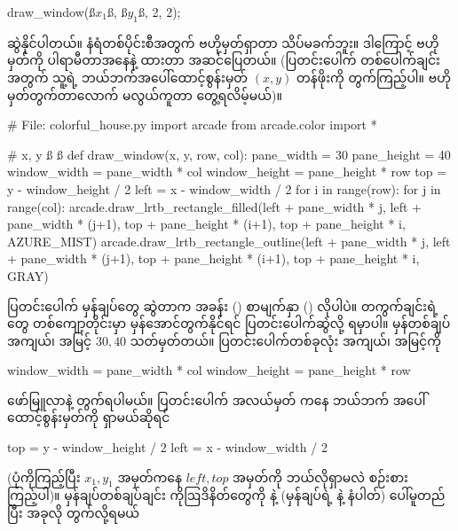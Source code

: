 %
\begin{py}
draw_window(ß$x_1$ß, ß$y_1$ß, 2, 2);
\end{py}
%
ဆွဲနိုင်ပါတယ်။ နံရံတစ်ပိုင်းစီအတွက် ဗဟိုမှတ်ရှာတာ သိပ်မခက်ဘူး။ ဒါကြောင့် ဗဟိုမှတ်ကို ပါရာမီတာအနေနဲ့ ထားတာ အဆင်ပြေတယ်။ (ပြတင်းပေါက် တစ်ပေါက်ချင်းအတွက်  သူ့ရဲ့ ဘယ်ဘက်အပေါ်ထောင့်စွန်းမှတ် $(x,y)$ တန်ဖိုးကို တွက်ကြည့်ပါ။ ဗဟိုမှတ်တွက်တာလောက် မလွယ်ကူတာ တွေ့ရလိမ့်မယ်)။ 

%
\begin{py}
# File: colorful_house.py
import arcade
from arcade.color import *

# x, y ß  ß
def draw_window(x, y, row, col):
    pane_width = 30
    pane_height = 40
    window_width = pane_width * col
    window_height = pane_height * row
    top = y - window_height / 2
    left = x - window_width / 2
    for i in range(row):
        for j in range(col):
            arcade.draw_lrtb_rectangle_filled(left + pane_width * j,
                                              left + pane_width * (j+1),
                                              top + pane_height * (i+1),
                                              top + pane_height * i,
                                              AZURE_MIST)
            arcade.draw_lrtb_rectangle_outline(left + pane_width * j,
                                               left + pane_width * (j+1),
                                               top + pane_height * (i+1),
                                               top + pane_height * i,
                                               GRAY)
\end{py}
%
ပြတင်းပေါက် မှန်ချပ်တွေ ဆွဲတာက အခန်း (\fRefNo{\ref{ch:ch07ctlstmt}}) စာမျက်နှာ (\fRefNo{\pageref{lst:checkerboard}})  လိုပါပဲ။ တကွက်ချင်းရဲ့  တွေ  တစ်ကျော့တိုင်းမှာ မှန်အောင်တွက်နိုင်ရင် ပြတင်းပေါက်ဆွဲလို့ ရမှာပါ။ မှန်တစ်ချပ် အကျယ်၊ အမြင့် $30, 40$ သတ်မှတ်တယ်။ ပြတင်းပေါက်တစ်ခုလုံး အကျယ်၊ အမြင့်ကို
\begin{codetxt}
window_width = pane_width * col
window_height = pane_height * row
\end{codetxt}
ဖော်မြူလာနဲ့ တွက်ရပါမယ်။ ပြတင်းပေါက် အလယ်မှတ်  ကနေ ဘယ်ဘက် အပေါ်ထောင့်စွန်းမှတ်ကို ရှာမယ်ဆိုရင်
\begin{codetxt}
top = y - window_height / 2
left = x - window_width / 2
\end{codetxt}
(ပုံကိုကြည့်ပြီး $x_1, y_1$ အမှတ်ကနေ $left, top$ အမှတ်ကို ဘယ်လိုရှာမလဲ စဉ်းစားကြည့်ပါ)။ မှန်ချပ်တစ်ချပ်ချင်း ကိုဩဒိနိတ်တွေကို  နဲ့   (မှန်ချပ်ရဲ့  နဲ့  နံပါတ်) ပေါ်မူတည်ပြီး အခုလို တွက်လို့ရမယ်

